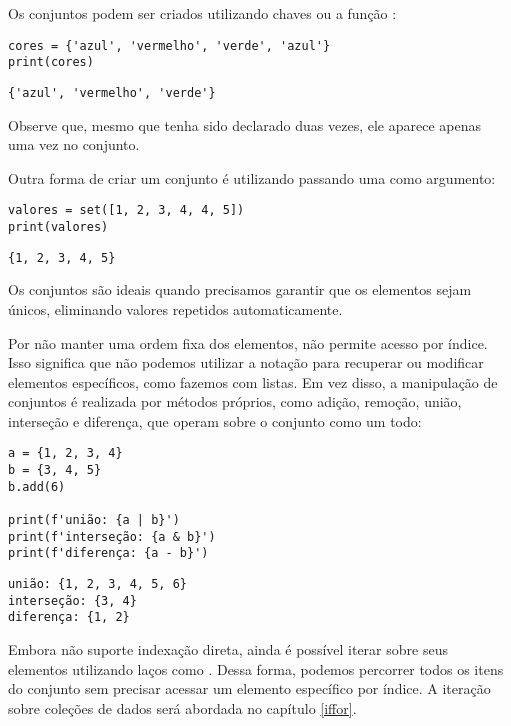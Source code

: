 Os conjuntos podem ser criados utilizando chaves \inlcode{\{\}} ou a função :
\begin{verbatim}
cores = {'azul', 'vermelho', 'verde', 'azul'}
print(cores)
\end{verbatim}
\begin{verbatim}
{'azul', 'vermelho', 'verde'}
\end{verbatim}

Observe que, mesmo que  tenha sido declarado duas vezes, ele aparece apenas uma vez no conjunto.

Outra forma de criar um conjunto é utilizando  passando uma  como argumento:
\begin{verbatim}
valores = set([1, 2, 3, 4, 4, 5])
print(valores)
\end{verbatim}
\begin{verbatim}
{1, 2, 3, 4, 5}
\end{verbatim}

Os conjuntos são ideais quando precisamos garantir que os elementos sejam únicos, eliminando valores repetidos automaticamente.

Por não manter uma ordem fixa dos elementos,  não permite acesso por índice.
Isso significa que não podemos utilizar a notação  para recuperar ou modificar elementos
específicos, como fazemos com listas.
Em vez disso, a manipulação de conjuntos é realizada por métodos próprios, como adição, remoção, união, interseção e
diferença, que operam sobre o conjunto como um todo:

\begin{verbatim}
a = {1, 2, 3, 4}
b = {3, 4, 5}
b.add(6)

print(f'união: {a | b}')
print(f'interseção: {a & b}')
print(f'diferença: {a - b}')
\end{verbatim}
\begin{verbatim}
união: {1, 2, 3, 4, 5, 6}
interseção: {3, 4}
diferença: {1, 2}
\end{verbatim}

Embora  não suporte indexação direta, ainda é possível iterar sobre seus elementos utilizando laços
como .
Dessa forma, podemos percorrer todos os itens do conjunto sem precisar acessar um elemento
específico por índice.
A iteração sobre coleções de dados será abordada no capítulo \ref{iffor}.

